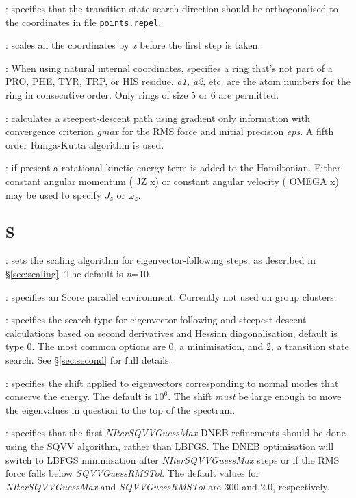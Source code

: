 {{{: specifies that the transition state search direction should
be orthogonalised to the coordinates in file {\tt points.repel}.

: scales all the coordinates by {\it x}
before the first step is taken. 

: When using natural internal coordinates, specifies
  a ring that's not part of a PRO, PHE, TYR, TRP, or HIS residue. {\it a1,
  a2}, etc. are the atom numbers for the ring in consecutive order. Only rings
  of size 5 or 6 are permitted.

: calculates a steepest-descent path using gradient only
      information with convergence criterion {\it gmax\/} for the RMS force and initial
      precision {\it eps\/}. A fifth order Runga-Kutta algorithm is used.

: if present a rotational kinetic energy term is
added to the Hamiltonian. Either constant angular momentum ({ JZ x\/}) or
constant angular velocity ({ OMEGA x\/}) may be used to specify $J_z$
or $\omega_z$.


\subsection{S}
: sets the scaling algorithm for eigenvector-following
steps, as described in \S\ref{sec:scaling}. The default is {\it n\/}=10.

: specifies an Score parallel environment. 
Currently not used on group clusters.

: specifies the search type for eigenvector-following and
steepest-descent calculations based on second derivatives and Hessian diagonalisation, default is type 0.
The most common options are 0, a minimisation, and 2, a transition state search. See
\S\ref{sec:second} for full details.

: specifies the shift applied to eigenvectors corresponding
to normal modes that conserve the energy. The default is $10^6$. The shift {\it must\/} be
large enough to move the eigenvalues in question to the top of the spectrum.

:
specifies that the first {\it NIterSQVVGuessMax\/} DNEB refinements should be
done using the SQVV algorithm, rather than LBFGS.\cite{TrygubenkoW04}
The DNEB optimisation will switch to LBFGS minimisation after {\it NIterSQVVGuessMax\/}
steps or if the RMS force falls below {\it SQVVGuessRMSTol\/}.
The default values for {\it NIterSQVVGuessMax\/} and {\it SQVVGuessRMSTol\/}
are 300 and 2.0, respectively.

}}}

